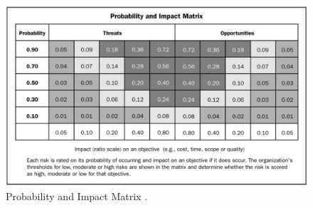\begin{figure}[H]
	\centering
	\includegraphics[width=\linewidth]{./images/risks2}
	\caption{Probability and Impact Matrix \cite{ProjectManagementInstitute2004}.}
	\label{fig:risks2}
\end{figure}

